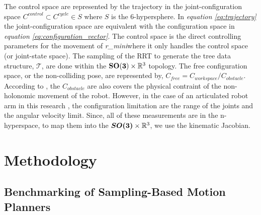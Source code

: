 \documentclass[a4paper, 10pt]{article}
\numberwithin{equation}{section} %
\newcommand\rimini[0]{\textit{r\_mini}} %
\begin{document}
The control space are represented by the trajectory in the joint-configuration
space $C^{control} \subset C^{cycle}\in S $
where $S$ is the 6-hypersphere. In \textit{equation \ref{eq:trajectory}} the
joint-configuration space are equivalent with the configuration space in 
\textit{equation \ref{eq:configuration_vector}}. 
The control space
is the direct controlling parameters for the movement of 
\rimini where it
only handles the control space (or joint-state space).
The sampling of the RRT to generate the tree data structure, $\mathcal{T}$,
are done within the $\vb{SO(3)} \times \mathbb{R}^3$ topology. The free
configuration space, or the non-colliding pose, are represented by, 
$C_{free} = C_{workspace} / C_{obstacle}$. According to 
\textcite{LaValle1998}, the $C_{obstacle}$ are also covers 
the physical contraint of the non-holonomic movement of the robot. 
However, in the case of an articulated robot arm in this research
, the configuration 
limitation are the range of the joints and the angular velocity limit. 
Since, all of these
measurements are in the n-hyperspace, to map them into the
$\vb*{SO(3)} \times \mathbb{R}^3$, we use the kinematic Jacobian.




\section{Methodology}
\subsection{Benchmarking of Sampling-Based Motion Planners}
\end{document}
